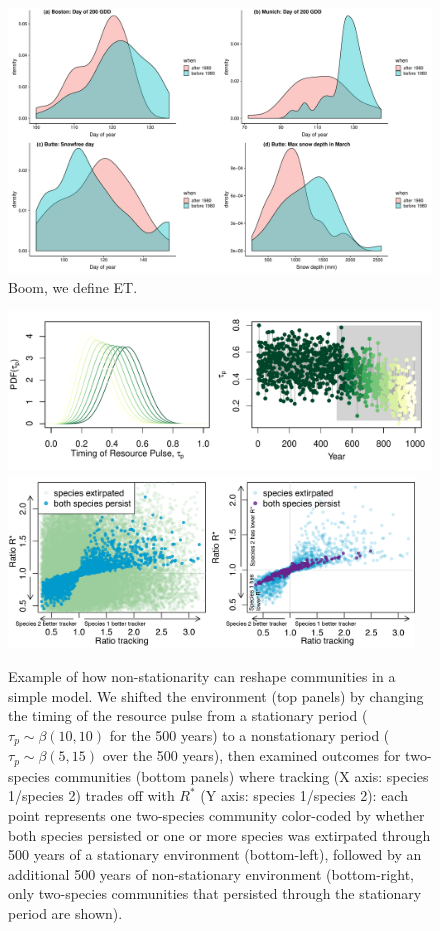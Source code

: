 \documentclass[11pt,letterpaper]{article}
\begin{document}
\begin{figure}[h!]
\centering
\includegraphics[width=1\textwidth]{..//..//..//R/graphs/otherdat/climdata.pdf}
\caption{Boom, we define ET.} 
 \label{fig:defineET}
\end{figure}

\begin{figure}[h!]
\centering
\includegraphics[width=1\textwidth]{..//..//..//R/graphs/modelruns/manuscript/modelsuppAlt.pdf}
\includegraphics[width=0.96\textwidth]{..//..//..//R/graphs/modelruns/manuscript/alpharstar_2panelwide_adj.png}
\caption{Example of how non-stationarity can reshape communities in a simple model. We shifted the environment (top panels) by changing the timing of the resource pulse from a stationary period ($\tau_{p} \sim \beta(10,10)$ for the 500 years) to a nonstationary period ($\tau_{p}\sim \beta(5,15)$ over the 500 years), then examined outcomes for two-species communities (bottom panels) where tracking (X axis: species 1/species 2) trades off with $R^*$ (Y axis: species 1/species 2): each point represents one two-species community color-coded by whether both species persisted or one or more species was extirpated through 500 years of a stationary environment (bottom-left), followed by an additional 500 years of non-stationary environment (bottom-right, only two-species communities that persisted through the stationary period are shown).}
\label{fig:modelfig} 
\end{figure}
\end{document}
